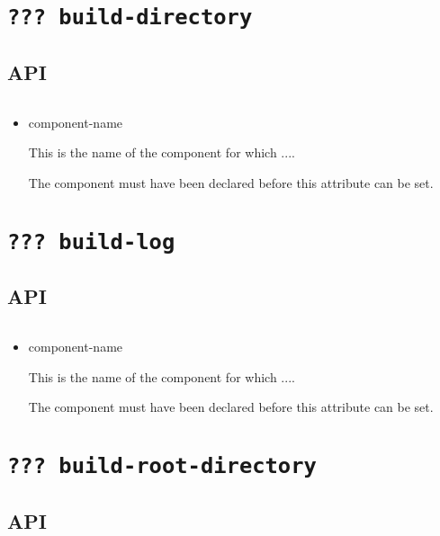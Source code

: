 \section{\texttt{??? build-directory}}\label{api:build-directory}

\subsection{API}

\begin{verbatim}

\end{verbatim}

\begin{itemize}
\item component-name

  This is the name of the component for which ....

  The component must have been declared before this attribute can be
  set.

\end{itemize}

\section{\texttt{??? build-log}}\label{api:build-log}

\subsection{API}

\begin{verbatim}

\end{verbatim}

\begin{itemize}
\item component-name

  This is the name of the component for which ....

  The component must have been declared before this attribute can be
  set.

\end{itemize}

\section{\texttt{??? build-root-directory}}\label{api:build-root-directory}

\subsection{API}

